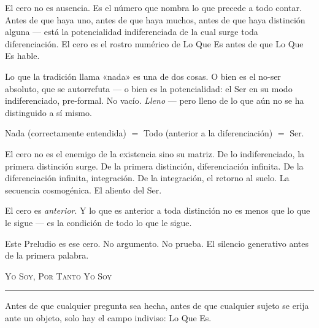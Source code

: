\documentclass[10pt, openany, oneside]{book}
\renewcommand{\large}{\fontsize{11.5}{14}\selectfont}
\begin{document}
\noindent El cero no es ausencia. Es el número que nombra lo que precede a todo contar. Antes de que haya uno, antes de que haya muchos, antes de que haya distinción alguna --- está la potencialidad indiferenciada de la cual surge toda diferenciación. El cero es el rostro numérico de Lo Que Es antes de que Lo Que Es hable.

\vspace{0.5em}

\noindent Lo que la tradición llama «nada» es una de dos cosas. O bien es el no-ser absoluto, que se autorrefuta --- o bien es la potencialidad: el Ser en su modo indiferenciado, pre-formal. No vacío. \textit{Lleno} --- pero lleno de lo que aún no se ha distinguido a sí mismo.

\vspace{0.5em}

\noindent Nada (correctamente entendida) $=$ Todo (anterior a la diferenciación) $=$ Ser.

\vspace{0.5em}

\noindent El cero no es el enemigo de la existencia sino su matriz. De lo indiferenciado, la primera distinción surge. De la primera distinción, diferenciación infinita. De la diferenciación infinita, integración. De la integración, el retorno al suelo. La secuencia cosmogénica. El aliento del Ser.

\vspace{0.5em}

\noindent El cero es \textit{anterior}. Y lo que es anterior a toda distinción no es menos que lo que le sigue --- es la condición de todo lo que le sigue.

\vspace{0.5em}

\noindent Este Preludio es ese cero. No argumento. No prueba. El silencio generativo antes de la primera palabra.

\vspace{2em}

\begin{center}
    {\large\scshape Yo Soy, Por Tanto Yo Soy}\\[0.3em]
    \rule{0.2\textwidth}{0.3pt}
\end{center}

\vspace{1em}

\noindent Antes de que cualquier pregunta sea hecha, antes de que cualquier sujeto se erija ante un objeto, solo hay el campo indiviso: Lo Que Es.
\end{document}
